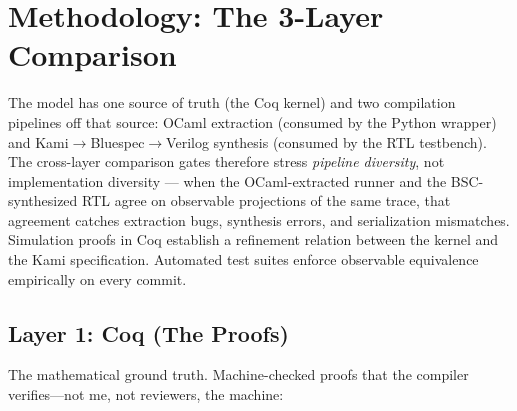\section{Methodology: The 3-Layer Comparison}

The model has one source of truth (the Coq kernel) and two compilation pipelines off that source: OCaml extraction (consumed by the Python wrapper) and Kami$\to$Bluespec$\to$Verilog synthesis (consumed by the RTL testbench). The cross-layer comparison gates therefore stress \emph{pipeline diversity}, not implementation diversity --- when the OCaml-extracted runner and the BSC-synthesized RTL agree on observable projections of the same trace, that agreement catches extraction bugs, synthesis errors, and serialization mismatches. Simulation proofs in Coq establish a refinement relation between the kernel and the Kami specification. Automated test suites enforce observable equivalence empirically on every commit.

\subsection{Layer 1: Coq (The Proofs)}

The mathematical ground truth. Machine-checked proofs that the compiler verifies---not me, not reviewers, the machine:

